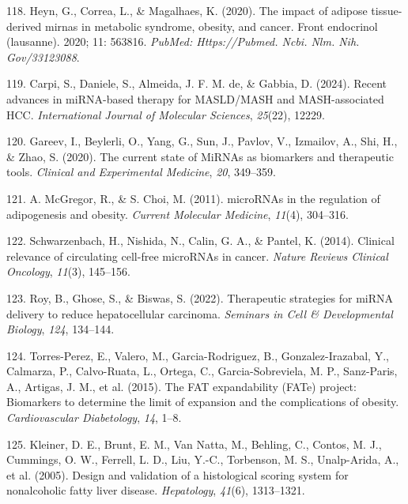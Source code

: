 \documentclass[
  11pt,
  letterpaper,
]{book}
\newlength{\cslhangindent}
\newenvironment{CSLReferences}[2] %
 {\begin{list}{}{%
  \setlength{\itemindent}{0pt}
  \setlength{\leftmargin}{0pt}
  \setlength{\parsep}{0pt}
  \ifodd #1
   \setlength{\leftmargin}{\cslhangindent}
   \setlength{\itemindent}{-1\cslhangindent}
  \fi
  \setlength{\itemsep}{#2\baselineskip}}}
 {\end{list}}
\begin{document}
\begin{CSLReferences}{1}{0}
118. Heyn, G., Correa, L., \& Magalhaes, K. (2020). The impact of
adipose tissue-derived mirnas in metabolic syndrome, obesity, and
cancer. Front endocrinol (lausanne). 2020; 11: 563816. \emph{PubMed:
Https://Pubmed. Ncbi. Nlm. Nih. Gov/33123088}.

119. Carpi, S., Daniele, S., Almeida, J. F. M. de, \& Gabbia, D. (2024).
Recent advances in miRNA-based therapy for MASLD/MASH and
MASH-associated HCC. \emph{International Journal of Molecular Sciences},
\emph{25}(22), 12229.

120. Gareev, I., Beylerli, O., Yang, G., Sun, J., Pavlov, V., Izmailov,
A., Shi, H., \& Zhao, S. (2020). The current state of MiRNAs as
biomarkers and therapeutic tools. \emph{Clinical and Experimental
Medicine}, \emph{20}, 349--359.

121. A. McGregor, R., \& S. Choi, M. (2011). microRNAs in the regulation
of adipogenesis and obesity. \emph{Current Molecular Medicine},
\emph{11}(4), 304--316.

122. Schwarzenbach, H., Nishida, N., Calin, G. A., \& Pantel, K. (2014).
Clinical relevance of circulating cell-free microRNAs in cancer.
\emph{Nature Reviews Clinical Oncology}, \emph{11}(3), 145--156.

123. Roy, B., Ghose, S., \& Biswas, S. (2022). Therapeutic strategies
for miRNA delivery to reduce hepatocellular carcinoma. \emph{Seminars in
Cell \& Developmental Biology}, \emph{124}, 134--144.

124. Torres-Perez, E., Valero, M., Garcia-Rodriguez, B.,
Gonzalez-Irazabal, Y., Calmarza, P., Calvo-Ruata, L., Ortega, C.,
Garcia-Sobreviela, M. P., Sanz-Paris, A., Artigas, J. M., et al. (2015).
The FAT expandability (FATe) project: Biomarkers to determine the limit
of expansion and the complications of obesity. \emph{Cardiovascular
Diabetology}, \emph{14}, 1--8.

125. Kleiner, D. E., Brunt, E. M., Van Natta, M., Behling, C., Contos,
M. J., Cummings, O. W., Ferrell, L. D., Liu, Y.-C., Torbenson, M. S.,
Unalp-Arida, A., et al. (2005). Design and validation of a histological
scoring system for nonalcoholic fatty liver disease. \emph{Hepatology},
\emph{41}(6), 1313--1321.


\end{CSLReferences}
\end{document}
